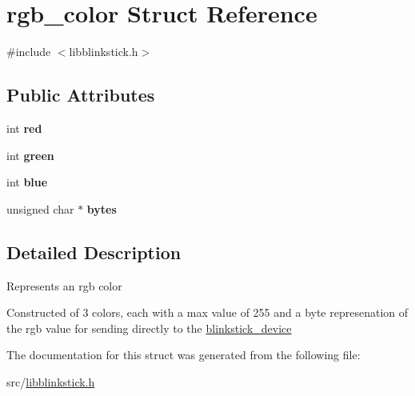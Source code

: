 \hypertarget{structrgb__color}{}\section{rgb\+\_\+color Struct Reference}
\label{structrgb__color}


{\ttfamily \#include $<$libblinkstick.\+h$>$}

\subsection*{Public Attributes}
\begin{DoxyCompactItemize}
\item 
\mbox{\label{structrgb__color_a7a39538463823d01c82060199b3d2dbc}} 
int {\bfseries red}
\item 
\mbox{\label{structrgb__color_ae3b3d93de86c1f85fbc775c7c639fedf}} 
int {\bfseries green}
\item 
\mbox{\label{structrgb__color_a58a1e68e249f0ad31eb0770801610dda}} 
int {\bfseries blue}
\item 
\mbox{\label{structrgb__color_a715c0944389836fb6f2b3c601c755bd8}} 
unsigned char $\ast$ {\bfseries bytes}
\end{DoxyCompactItemize}


\subsection{Detailed Description}
Represents an rgb color

Constructed of 3 colors, each with a max value of 255 and a byte represenation of the rgb value for sending directly to the \hyperlink{structblinkstick__device}{blinkstick\+\_\+device} 

The documentation for this struct was generated from the following file\+:\begin{DoxyCompactItemize}
\item 
src/\hyperlink{libblinkstick_8h}{libblinkstick.\+h}\end{DoxyCompactItemize}
